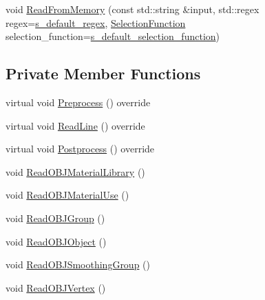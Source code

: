 \begin{DoxyCompactItemize}
\item 
void \mbox{\hyperlink{classmage_1_1rendering_1_1loader_1_1_o_b_j_reader_a6411d017fe1c7f30a544e2f0176f14a2}{Read\+From\+Memory}} (const std\+::string \&input, std\+::regex regex=\mbox{\hyperlink{classmage_1_1_line_reader_a6713da665d123ab39293c0c5a4e8e1de}{s\+\_\+default\+\_\+regex}}, \mbox{\hyperlink{classmage_1_1_line_reader_a17bbae61a3ce30bdb251d6c76e1a4522}{Selection\+Function}} selection\+\_\+function=\mbox{\hyperlink{classmage_1_1_line_reader_a93da10f6f69b44accfec8074712f35de}{s\+\_\+default\+\_\+selection\+\_\+function}})
\end{DoxyCompactItemize}
\subsection*{Private Member Functions}
\begin{DoxyCompactItemize}
\item 
virtual void \mbox{\hyperlink{classmage_1_1rendering_1_1loader_1_1_o_b_j_reader_ad082a6295259f7e8af2c60c182ea55d3}{Preprocess}} () override
\item 
virtual void \mbox{\hyperlink{classmage_1_1rendering_1_1loader_1_1_o_b_j_reader_adcf31a8bacf23cac2577f679c6bac729}{Read\+Line}} () override
\item 
virtual void \mbox{\hyperlink{classmage_1_1rendering_1_1loader_1_1_o_b_j_reader_a281c16ef7d20a7c1416923f3cadee33a}{Postprocess}} () override
\item 
void \mbox{\hyperlink{classmage_1_1rendering_1_1loader_1_1_o_b_j_reader_aa898eb5cac6a5e04b1da9329587a81cd}{Read\+O\+B\+J\+Material\+Library}} ()
\item 
void \mbox{\hyperlink{classmage_1_1rendering_1_1loader_1_1_o_b_j_reader_a5aa719224a08175bcbcb26873e2fb5e1}{Read\+O\+B\+J\+Material\+Use}} ()
\item 
void \mbox{\hyperlink{classmage_1_1rendering_1_1loader_1_1_o_b_j_reader_a4e733a0afea4b82e3aea89fe58f5bfba}{Read\+O\+B\+J\+Group}} ()
\item 
void \mbox{\hyperlink{classmage_1_1rendering_1_1loader_1_1_o_b_j_reader_a519f333ce13777d469c63eae7ab8dcf4}{Read\+O\+B\+J\+Object}} ()
\item 
void \mbox{\hyperlink{classmage_1_1rendering_1_1loader_1_1_o_b_j_reader_ac7f3807cf0a0ae24b340cb8208c5b2ef}{Read\+O\+B\+J\+Smoothing\+Group}} ()
\item 
void \mbox{\hyperlink{classmage_1_1rendering_1_1loader_1_1_o_b_j_reader_a0f6e0d744b2baf94bca4dfda6c2cc194}{Read\+O\+B\+J\+Vertex}} ()
\item 

\end{DoxyCompactItemize}
